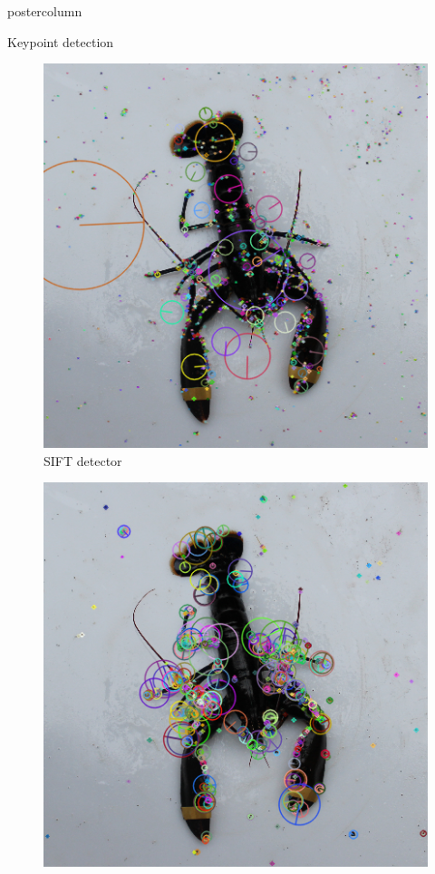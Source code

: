 \documentclass{beamer}
\begin{document}
\begin{frame}
\begin{columns}
\begin{column}{.4\textwidth}
\begin{beamercolorbox}[center]{postercolumn}
\begin{minipage}{.98\textwidth}
{\begin{myblock}{Keypoint detection}
\begin{center}
\begin{minipage}{0.42\textwidth}
\begin{figure}
\includegraphics[width=1\textwidth, keepaspectratio]{imgs/sift.png}
\caption{SIFT detector}
\end{figure}
\end{minipage}
\hspace{0.7cm}
\begin{minipage}{0.42\textwidth}
\begin{figure}
\includegraphics[width=1\textwidth, keepaspectratio]{imgs/surf.png}

\end{figure}
\end{minipage}
\end{center}
\end{myblock}}
\end{minipage}
\end{beamercolorbox}
\end{column}
\end{columns}
\end{frame}
\end{document}
